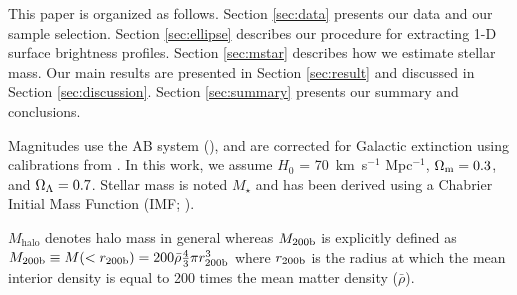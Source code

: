 \documentclass[a4paper,fleqn,usenatbib]{mnras}
\def\mstar{{$M_{\star}$}}
\begin{document}
    This paper is organized as follows. 
    Section \ref{sec:data} presents our data and our sample selection. 
    Section \ref{sec:ellipse} describes our procedure for extracting 1-D surface 
    brightness profiles. 
    Section \ref{sec:mstar} describes how we estimate stellar mass. 
    Our main results are presented in Section \ref{sec:result} and discussed in 
    Section \ref{sec:discussion}. 
    Section \ref{sec:summary} presents our summary and conclusions.

    Magnitudes use the AB system (\citealt{Oke1983}), and are corrected for Galactic 
    extinction using calibrations from \citet{Schlafly11}.
    In this work, we assume $H_0$ = 70~km~s$^{-1}$ Mpc$^{-1}$, ${\Omega}_{\rm m}=0.3$, 
    and ${\Omega}_{\rm \Lambda}=0.7$.
    Stellar mass is noted \mstar{} and has been derived using a Chabrier Initial Mass 
    Function (IMF; \citealt{Chabrier2003}).   
      
    $M_{\mathrm{halo}}$ denotes halo mass in general whereas $M_{\rm 200b}$ is 
    explicitly defined as $M_{\rm 200b}\equiv M(<r_{\rm 200b})=200\bar{\rho} 
    \frac{4}{3}\pi r_{\rm 200b}^3$ where $r_{\rm 200b}$
    is the radius at which the mean interior density is equal to 200 times
    the mean matter density ($\bar{\rho}$). 
    
\end{document}
